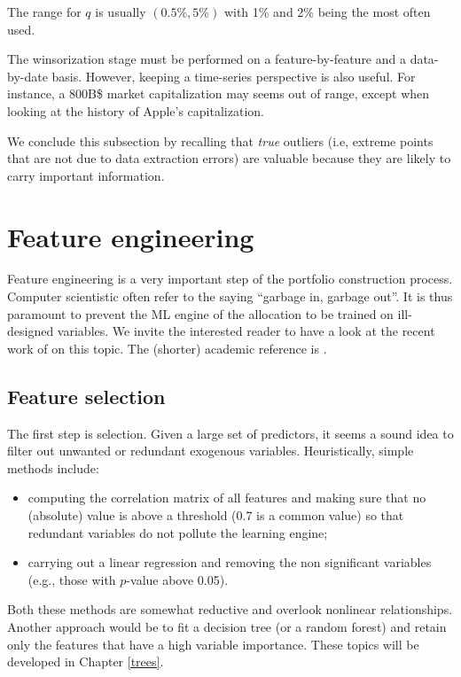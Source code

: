 \documentclass[]{krantz}
\providecommand{\tightlist}{%
  \setlength{\itemsep}{0pt}\setlength{\parskip}{0pt}}
\theoremstyle{definition}
\theoremstyle{definition}
\theoremstyle{definition}
\theoremstyle{remark}
\begin{document}
The range for \(q\) is usually \((0.5\%, 5\%)\) with 1\% and 2\% being
the most often used.

The winsorization stage must be performed on a feature-by-feature and a
data-by-date basis. However, keeping a time-series perspective is also
useful. For instance, a 800B\$ market capitalization may seems out of
range, except when looking at the history of Apple's capitalization.

We conclude this subsection by recalling that \emph{true} outliers (i.e,
extreme points that are not due to data extraction errors) are valuable
because they are likely to carry important information.

\hypertarget{feateng}{%
\section{Feature engineering}\label{feateng}}

Feature engineering is a very important step of the portfolio
construction process. Computer scientistic often refer to the saying
``garbage in, garbage out''. It is thus paramount to prevent the ML
engine of the allocation to be trained on ill-designed variables. We
invite the interested reader to have a look at the recent work of
\citet{kuhn2019feature} on this topic. The (shorter) academic reference
is \citet{guyon2003introduction}.

\hypertarget{feature-selection}{%
\subsection{Feature selection}\label{feature-selection}}

The first step is selection. Given a large set of predictors, it seems a
sound idea to filter out unwanted or redundant exogenous variables.
Heuristically, simple methods include:

\begin{itemize}
\tightlist
\item
  computing the correlation matrix of all features and making sure that
  no (absolute) value is above a threshold (0.7 is a common value) so
  that redundant variables do not pollute the learning engine;\\
\item
  carrying out a linear regression and removing the non significant
  variables (e.g., those with \(p\)-value above 0.05).
\end{itemize}

Both these methods are somewhat reductive and overlook nonlinear
relationships. Another approach would be to fit a decision tree (or a
random forest) and retain only the features that have a high variable
importance. These topics will be developed in Chapter \ref{trees}.
\end{document}
